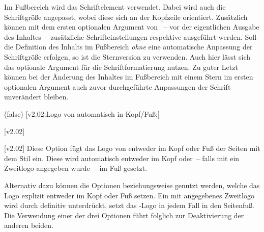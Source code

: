 \begin{DeclareEntity*}{}
\begin{DeclareEntity*}{}
\begin{DeclareEntity*}{}
\begin{Declaration}
\begin{Declaration}
Im Fußbereich wird das Schriftelement  verwendet. Dabei wird 
auch die Schriftgröße angepasst, wobei diese sich an der Kopfzeile orientiert. 
Zusätzlich können mit dem ersten optionalen Argument von ~-- 
vor der eigentlichen Ausgabe des Inhaltes~-- zusätzliche Schrifteinstellungen 
respektive  ausgeführt werden. Soll die Definition des 
Inhalts im Fußbereich \emph{ohne} eine automatische Anpassung der Schriftgröße 
erfolgen, so ist die Sternversion  zu verwenden. Auch hier 
lässt sich das optionale Argument für die Schriftformatierung nutzen.
%
Zu guter Letzt können bei der Änderung des Inhaltes im Fußbereich mit einem 
Stern im ersten optionalen Argument 
 auch zuvor 
durchgeführte Anpassungen der Schrift unverändert bleiben.
\end{Declaration}
\end{Declaration}

\begin{Declaration}
  {}
  (false)
  [v2.02:Logo von \DDC automatisch in Kopf/Fuß;]
\begin{Declaration}
  {}
  [v2.02]
\begin{Declaration}
  {}
  [v2.02]
Diese Option fügt das Logo von \DDC entweder im Kopf oder Fuß der Seiten mit 
dem Stil  ein. Diese wird automatisch entweder im Kopf 
oder~-- falls mit  ein Zweitlogo angegeben wurde~-- im Fuß 
gesetzt.

Alternativ dazu können die Optionen  beziehungsweise 
 genutzt werden, welche das Logo explizit entweder im Kopf oder 
Fuß setzen. Ein mit  angegebenes Zweitlogo wird durch 
 definitiv unterdrückt,  setzt 
das \DDC-Logo in jedem Fall in den Seitenfuß. Die Verwendung einer der drei 
Optionen führt folglich zur Deaktivierung der anderen beiden.


\end{Declaration}
\end{Declaration}
\end{Declaration}
\end{DeclareEntity*}
\end{DeclareEntity*}
\end{DeclareEntity*}
